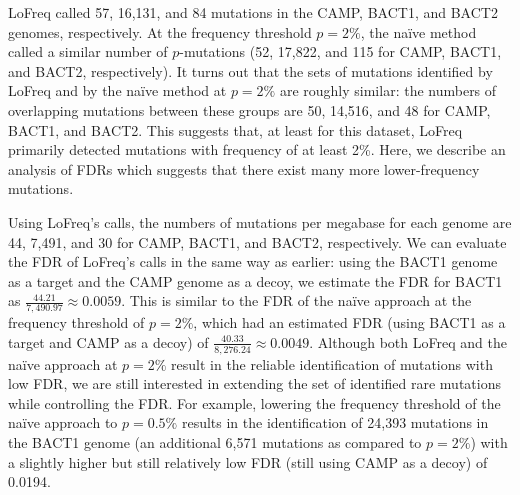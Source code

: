 LoFreq called 57, 16,131, and 84 mutations in the CAMP, BACT1, and BACT2 genomes, respectively. At the frequency threshold $p = 2\%$, the na\"ive method called a similar number of $p$-mutations (52, 17,822, and 115 for CAMP, BACT1, and BACT2, respectively). It turns out that the sets of mutations identified by LoFreq and by the na\"ive method at $p = 2\%$ are roughly similar: the numbers of overlapping mutations between these groups are 50, 14,516, and 48 for CAMP, BACT1, and BACT2. This suggests that, at least for this dataset, LoFreq primarily detected mutations with frequency of at least 2\%. Here, we describe an analysis of FDRs which suggests that there exist many more lower-frequency mutations.

Using LoFreq's calls, the numbers of mutations per megabase for each genome are 44, 7,491, and 30 for CAMP, BACT1, and BACT2, respectively. We can evaluate the FDR of LoFreq's calls in the same way as earlier: using the BACT1 genome as a target and the CAMP genome as a decoy, we estimate the FDR for BACT1 as $\frac{44.21}{7,490.97} \approx 0.0059$. This is similar to the FDR of the na\"ive approach at the frequency threshold of $p = 2\%$, which had an estimated FDR (using BACT1 as a target and CAMP as a decoy) of $\frac{40.33}{8,276.24} \approx 0.0049$. Although both LoFreq and the na\"ive approach at $p = 2\%$ result in the reliable identification of mutations with low FDR, we are still interested in extending the set of identified rare mutations while controlling the FDR. For example, lowering the frequency threshold of the na\"ive approach to $p = 0.5\%$ results in the identification of 24,393 mutations in the BACT1 genome (an additional 6,571 mutations as compared to $p = 2\%$) with a slightly higher but still relatively low FDR (still using CAMP as a decoy) of 0.0194.\endinput